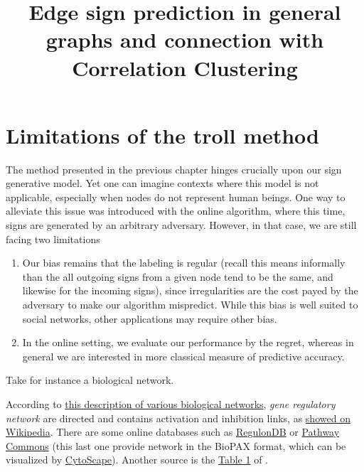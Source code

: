 \documentclass[nobib,a4paper,11pt,oneside,onecolumn,openany,notitlepage,final,svgnames]{tufte-handout}
\title{Edge sign prediction in general graphs and connection with Correlation Clustering}
\begin{document}
\maketitle

\section{Limitations of the troll method}
\label{sec:limitations_of_the_troll_method}

The method presented in the previous chapter hinges crucially upon our sign generative model. Yet
one can imagine contexts where this model is not applicable, especially when nodes do not represent
human beings. One way to alleviate this issue was introduced with the online algorithm, where this
time, signs are generated by an arbitrary adversary. However, in that case, we are still facing two
limitations
\begin{enumerate}
	\item Our bias remains that the labeling is regular (recall this means informally than the all
		outgoing signs from a given node tend to be the same, and likewise for the incoming signs),
		since irregularities are the cost payed by the adversary to make our algorithm mispredict. While
		this bias is well suited to social networks, other applications may require other
		bias.
	\item In the online setting, we evaluate our performance by the regret,
		whereas in general we are interested in more classical measure of predictive accuracy.
\end{enumerate}

Take for instance a biological network.

According to \href{https://web.stanford.edu/class/cs224w/slides/handout-bionets.pdf}%
{this description of various biological networks}, \emph{gene regulatory network} are directed and
contains activation and inhibition links, as \href{https://en.wikipedia.org/wiki/Gene_regulatory_network#Overview}%
{showed on Wikipedia}. There are some online databases such as
\href{http://regulondb.ccg.unam.mx/menu/download/datasets/index.jsp}%
{RegulonDB} or \href{http://www.pathwaycommons.org/pcviz/}{Pathway Commons} (this last one provide
network in the BioPAX format, which can be visualized by
\href{http://www.cytoscape.org/}{CytoScape}).
Another source is the \href{https://www.ncbi.nlm.nih.gov/pmc/articles/PMC2708159/table/T1}{Table 1}
of \cite{BioSigned09}.
\end{document}

